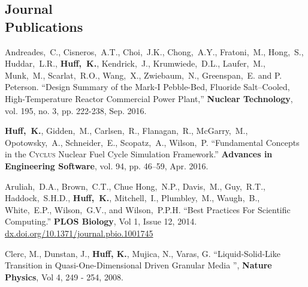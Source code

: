 \documentclass[margin,line]{resume}
\newcommand{\Cyclus}{\textsc{Cyclus}\xspace}%
\begin{document}
\begin{resume}
    \section{\mysidestyle Journal\\Publications}
      \begin{bibenum}
      \item Andreades,~C., Cisneros,~A.T., Choi,~J.K., Chong,~A.Y., 
              Fratoni,~M., Hong,~S., Huddar,~L.R., \textbf{Huff,~K.}, Kendrick,~J., 
              Krumwiede,~D.L., Laufer,~M., Munk,~M., Scarlat,~R.O., Wang,~X., 
              Zwiebaum,~N., Greenspan,~E. and P. Peterson.  ``Design Summary of 
              the Mark-I Pebble-Bed, Fluoride Salt–Cooled, High-Temperature 
              Reactor Commercial Power Plant,'' \textbf{Nuclear Technology}, vol. 195, 
              no. 3, pp. 222-238, Sep. 2016.
       \item \textbf{Huff,~K.}, Gidden,~M., Carlsen,~R., Flanagan,~R.,
       McGarry,~M., Opotowsky,~A., Schneider,~E.,
       Scopatz,~A., Wilson,~P.  ``Fundamental Concepts in the \Cyclus Nuclear Fuel Cycle
       Simulation Framework.'' \textbf{Advances in Engineering Software}, vol. 94, pp. 46–59, Apr. 2016.
       \item Aruliah,~D.A., Brown,~C.T., Chue Hong,~N.P., Davis,~M., Guy,~R.T.,
          Haddock,~S.H.D., \textbf{Huff,~K.}, Mitchell,~I., Plumbley,~M., Waugh,~B.,
          White,~E.P., Wilson,~G.V., and Wilson,~P.P.H.  ``Best Practices For
          Scientific Computing.'' \textbf{PLOS Biology}, Vol 1, Issue 12,
          2014. \url{dx.doi.org/10.1371/journal.pbio.1001745}
       \item Clerc, M., Dunstan, J., \textbf{Huff, K.}, Mujica, N., Varas, G.
          ``Liquid-Solid-Like Transition in Quasi-One-Dimensional Driven
          Granular Media '',  \textbf{Nature Physics}, Vol 4, 249 - 254, 2008.
      \end{bibenum}

\end{resume}
\end{document}
